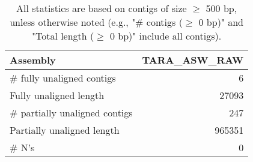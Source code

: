 \documentclass[12pt,a4paper]{article}
\begin{document}
\begin{table}[ht]
\begin{center}
\caption{All statistics are based on contigs of size $\geq$ 500 bp, unless otherwise noted (e.g., "\# contigs ($\geq$ 0 bp)" and "Total length ($\geq$ 0 bp)" include all contigs).}
\begin{tabular}{|l*{1}{|r}|}
\hline
Assembly & TARA\_ASW\_RAW \\ \hline
\# fully unaligned contigs & 6 \\ \hline
Fully unaligned length & 27093 \\ \hline
\# partially unaligned contigs & 247 \\ \hline
Partially unaligned length & 965351 \\ \hline
\# N's & 0 \\ \hline
\end{tabular}
\end{center}
\end{table}
\end{document}
